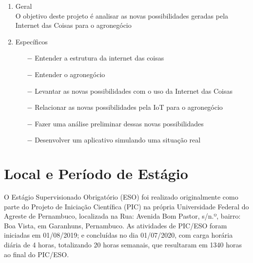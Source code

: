 \documentclass[eso]{bcc}
\begin{document}
\begin{enumerate}
    \item Geral\\
    O objetivo deste projeto é analisar as novas possibilidades geradas pela Internet das Coisas para o agronegócio
    \item Específicos
    \begin{enumerate}
        \item[$-$]  Entender a estrutura da internet das coisas
        \item[$-$] Entender o agronegócio
        \item[$-$] Levantar as novas possibilidades com o uso da Internet das Coisas
        \item[$-$] Relacionar as novas possibilidades pela IoT para o agronegócio 
        \item[$-$] Fazer uma análise preliminar dessas novas possibilidades
        \item[$-$] Desenvolver um aplicativo simulando uma situação real
    \end{enumerate}
\end{enumerate}





\chapter{Local e Período de Estágio}\label{chap:local}

\avisoPIC{}

O Estágio Supervisionado Obrigatório (ESO) foi realizado originalmente como parte do Projeto de 
Iniciação Científica (PIC) na própria Universidade Federal do Agreste de Pernambuco,
localizada na Rua: Avenida Bom Pastor, s/n.º, bairro: Boa Vista, em Garanhuns, Pernambuco.
As atividades de PIC/ESO foram iniciadas em 01/08/2019; e concluídas no dia 01/07/2020, com 
carga horária diária de 4 horas, totalizando 20 horas semanais, que resultaram em 1340 horas ao 
final do PIC/ESO\@.
\end{document}
